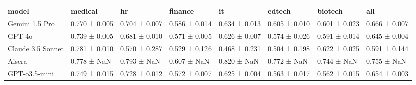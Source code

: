 \begin{tabular}{llllllll}
\toprule
model & medical & hr & finance & it & edtech & biotech & all \\
\midrule
Gemini 1.5 Pro & 0.770 ± 0.005 & 0.704 ± 0.007 & 0.586 ± 0.014 & 0.634 ± 0.013 & 0.605 ± 0.010 & 0.601 ± 0.023 & 0.666 ± 0.007 \\
GPT-4o & 0.739 ± 0.005 & 0.681 ± 0.010 & 0.571 ± 0.005 & 0.626 ± 0.007 & 0.574 ± 0.026 & 0.591 ± 0.014 & 0.645 ± 0.004 \\
Claude 3.5 Sonnet & 0.781 ± 0.010 & 0.570 ± 0.287 & 0.529 ± 0.126 & 0.468 ± 0.231 & 0.504 ± 0.198 & 0.622 ± 0.025 & 0.591 ± 0.144 \\
Aisera & 0.778 ± NaN & 0.793 ± NaN & 0.607 ± NaN & 0.820 ± NaN & 0.772 ± NaN & 0.744 ± NaN & 0.755 ± NaN \\
GPT-o3.5-mini & 0.749 ± 0.015 & 0.728 ± 0.012 & 0.572 ± 0.007 & 0.625 ± 0.004 & 0.563 ± 0.017 & 0.562 ± 0.015 & 0.654 ± 0.003 \\
\bottomrule
\end{tabular}
